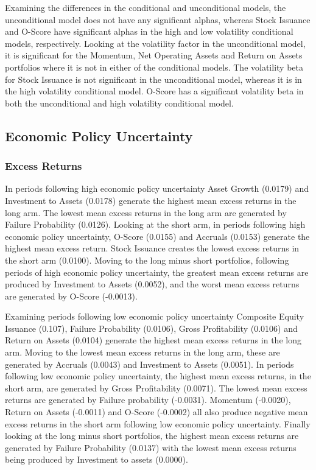 \documentclass[a4paper]{article}                 %
\begin{document}
Examining the differences in the conditional and unconditional models, the unconditional model does not have any significant alphas, whereas Stock Issuance and O-Score have significant alphas in the high and low volatility conditional models, respectively. Looking at the volatility factor in the unconditional model, it is significant for the Momentum, Net Operating Assets and Return on Assets portfolios where it is not in either of the conditional models. The volatility beta for Stock Issuance is not significant in the unconditional model, whereas it is in the high volatility conditional model. O-Score has a significant volatility beta in both the unconditional and high volatility conditional model.



\subsection{Economic Policy Uncertainty}
\subsubsection{Excess Returns}
In periods following high economic policy uncertainty Asset Growth (0.0179) and Investment to Assets (0.0178) generate the highest mean excess returns in the long arm. The lowest mean excess returns in the long arm are generated by Failure Probability (0.0126). Looking at the short arm, in periods following high economic policy uncertainty, O-Score (0.0155) and Accruals (0.0153) generate the highest mean excess return. Stock Issuance creates the lowest excess returns in the short arm (0.0100). Moving to the long minus short portfolios, following periods of high economic policy uncertainty, the greatest mean excess returns are produced by Investment to Assets (0.0052), and the worst mean excess returns are generated by O-Score (-0.0013).

Examining periods following low economic policy uncertainty Composite Equity Issuance (0.107), Failure Probability (0.0106), Gross Profitability (0.0106) and Return on Assets (0.0104) generate the highest mean excess returns in the long arm. Moving to the lowest mean excess returns in the long arm, these are generated by Accruals (0.0043) and Investment to Assets (0.0051). In periods following low economic policy uncertainty, the highest mean excess returns, in the short arm, are generated by Gross Profitability (0.0071). The lowest mean excess returns are generated by Failure probability (-0.0031). Momentum (-0.0020), Return on Assets (-0.0011) and O-Score (-0.0002) all also produce negative mean excess returns in the short arm following low economic policy uncertainty. Finally looking at the long minus short portfolios, the highest mean excess returns are generated by Failure Probability (0.0137) with the lowest mean excess returns being produced by Investment to assets (0.0000).
\end{document}
